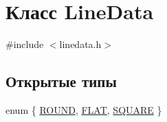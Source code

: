 \hypertarget{class_line_data}{\section{Класс Line\-Data}
\label{class_line_data}
}


{\ttfamily \#include $<$linedata.\-h$>$}

\subsection*{Открытые типы}
\begin{DoxyCompactItemize}
\item 
enum \{ \hyperlink{class_line_data_af2e2ee6851256e24a12203eda9402beaaab3bff3f6a4c9347d819e65d05f5fec3}{R\-O\-U\-N\-D}, 
\hyperlink{class_line_data_af2e2ee6851256e24a12203eda9402beaa396289cd387c745e869339a2c24aedb3}{F\-L\-A\-T}, 
\hyperlink{class_line_data_af2e2ee6851256e24a12203eda9402beaa24fd149f57d8f62d24ffb01013324720}{S\-Q\-U\-A\-R\-E}
 \}
\end{DoxyCompactItemize}
